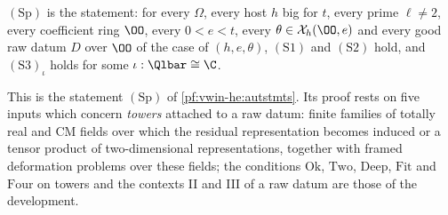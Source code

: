 \begin{definition}[$(\mathrm{Sp})$]\label{pf:eis:spstmt}
$(\mathrm{Sp})$ is the statement: for every $\Omega$, every host $h$ big for $t$, every prime $\ell\ne2$, every coefficient ring $\OO$, every
$0<e<t$, every $\theta\in\eisX_h(\OO,e)$ and every good raw datum $D$ over $\OO$ of the case of $(h,e,\theta)$, $(\mathrm{S1})$ and
$(\mathrm{S2})$ hold, and $(\mathrm{S3})_\iota$ holds for some $\iota:\Qlbar\cong\C$.
\end{definition}

This is the statement $(\mathrm{Sp})$ of \cref{pf:vwin-he:autstmts}. Its proof rests on five inputs which concern \emph{towers} attached to
a raw datum: finite families of totally real and CM fields over which the residual representation becomes induced or a tensor product
of two-dimensional representations, together with framed deformation problems over these fields; the conditions $\mathrm{Ok}$,
$\mathrm{Two}$, $\mathrm{Deep}$, $\mathrm{Fit}$ and $\mathrm{Four}$ on towers and the contexts II and III of a raw datum are those of the development.

